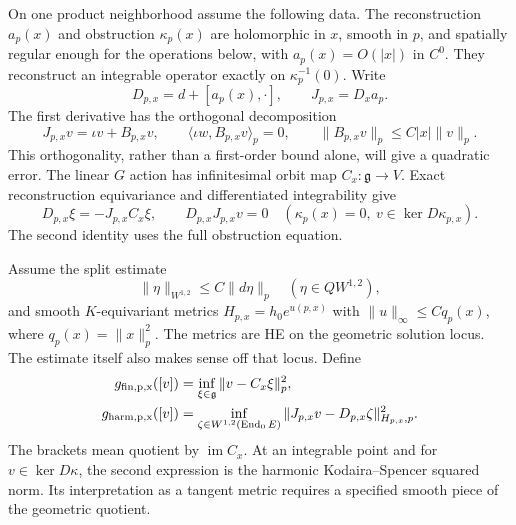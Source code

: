 \documentclass[11pt]{amsart}
\theoremstyle{definition}
\theoremstyle{remark}
\newcommand{\End}{\operatorname{End}}
\newcommand{\im}{\operatorname{im}}
\begin{document}
On one product neighborhood assume the following data. The reconstruction
$a_p(x)$ and obstruction $\kappa_p(x)$ are holomorphic in $x$, smooth in
$p$, and spatially regular enough for the operations below, with
$a_p(x)=O(|x|)$ in $C^0$. They reconstruct an integrable operator
exactly on $\kappa_p^{-1}(0)$. Write
\[
 D_{p,x}=d+[a_p(x),\cdot],\qquad J_{p,x}=D_xa_p.
\]
The first derivative has the orthogonal decomposition
\begin{equation}\label{eq:relative-hypotheses}
 J_{p,x}v=\iota v+B_{p,x}v,\qquad
 \langle\iota w,B_{p,x}v\rangle_p=0,\qquad
 \|B_{p,x}v\|_p\le C|x|\|v\|_p.
\end{equation}
This orthogonality, rather than a first-order bound alone, will give
a quadratic error. The linear $G$ action has infinitesimal orbit map
$C_x:\mathfrak g\to V$. Exact reconstruction equivariance and
differentiated integrability give
\begin{equation}\label{eq:relative-equivariance}
 D_{p,x}\xi=-J_{p,x}C_x\xi,\qquad
 D_{p,x}J_{p,x}v=0\quad
 (\kappa_p(x)=0,\ v\in\ker D\kappa_{p,x}).
\end{equation}
The second identity uses the full obstruction equation.

Assume the split estimate
\begin{equation}\label{eq:relative-coercivity}
 \|\eta\|_{W^{1,2}}\le C\|d\eta\|_p
 \quad(\eta\in QW^{1,2}),
\end{equation}
and smooth $K$-equivariant metrics $H_{p,x}=h_0e^{u(p,x)}$ with
$\|u\|_\infty\le Cq_p(x)$, where $q_p(x)=\|x\|_p^2$.
The metrics are HE on the geometric solution locus. The estimate itself
also makes sense off that locus. Define
\begin{align}
 g_{\rm fin,p,x}([v])
 &=\inf_{\xi\in\mathfrak g}\|v-C_x\xi\|_p^2,
 \label{eq:general-finite}\\
 g_{\rm harm,p,x}([v])
 &=\inf_{\zeta\in W^{1,2}(\End_0E)}
       \|J_{p,x}v-D_{p,x}\zeta\|_{H_{p,x},p}^2.
 \label{eq:general-harmonic}
\end{align}
The brackets mean quotient by $\im C_x$. At an integrable point and
for $v\in\ker D\kappa$, the second expression is the harmonic
Kodaira--Spencer squared norm. Its interpretation as a tangent metric
requires a specified smooth piece of the geometric quotient.
\end{document}
